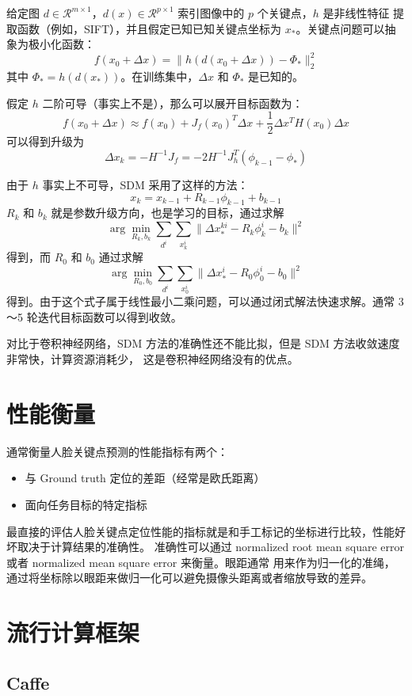 \documentclass{ctexart}
\begin{document}
给定图 $d \in \mathcal{R}^{m\times 1}$，$d(x) \in \mathcal{R}^{p \times 1}$ 索引图像中的 $p$ 个关键点，$h$ 是非线性特征
提取函数（例如，SIFT），并且假定已知已知关键点坐标为 $x_*$。关键点问题可以抽象为极小化函数：
$$
f(x_0 + \Delta x) = \| h(d(x_0 + \Delta x)) - \Phi_* \|_2^2
$$
其中 $\Phi_* = h(d(x_*))$。在训练集中，$\Delta x$ 和 $\Phi_*$ 是已知的。

假定 $h$ 二阶可导（事实上不是），那么可以展开目标函数为：
$$
f(x_0 + \Delta x) \approx f(x_0) + J_f(x_0)^T \Delta x + \frac 1 2 \Delta x^T H(x_0) \Delta x
$$
可以得到升级为
$$
\Delta x_k = -H^{-1} J_f = -2 H^{-1} J_h^T(\phi_{k-1} - \phi_*)
$$

由于 $h$ 事实上不可导，SDM 采用了这样的方法：
$$
x_k = x_{k-1} + R_{k-1} \phi_{k-1} + b_{k-1}
$$
$R_k$ 和 $b_k$ 就是参数升级方向，也是学习的目标，通过求解
$$
\arg\min_{R_k, b_k} \sum_{d^i} \sum_{x_k^i} \| \Delta x_*^{ki} - R_k \phi_k^i - b_k \|^2
$$
得到，而 $R_0$ 和 $b_0$ 通过求解
$$
\arg\min_{R_0, b_0} \sum_{d^i} \sum_{x_0^i} \| \Delta x_*^{i} - R_0 \phi_0^i - b_0 \|^2
$$
得到。由于这个式子属于线性最小二乘问题，可以通过闭式解法快速求解。通常 3～5 轮迭代目标函数可以得到收敛。

对比于卷积神经网络，SDM 方法的准确性还不能比拟，但是 SDM 方法收敛速度非常快，计算资源消耗少，
这是卷积神经网络没有的优点。

\section{性能衡量}

通常衡量人脸关键点预测的性能指标有两个：

\begin{itemize}
	\item 与 Ground truth 定位的差距（经常是欧氏距离）
	\item 面向任务目标的特定指标
\end{itemize}

最直接的评估人脸关键点定位性能的指标就是和手工标记的坐标进行比较，性能好坏取决于计算结果的准确性。
准确性可以通过 normalized root mean square error 或者 normalized mean square error 来衡量。眼距通常
用来作为归一化的准绳，通过将坐标除以眼距来做归一化可以避免摄像头距离或者缩放导致的差异。

\section{流行计算框架}

\subsection{Caffe}
\end{document}

